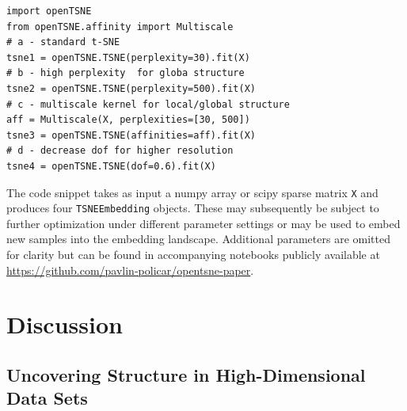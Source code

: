 \documentclass[twocolumn]{bmcart}
\begin{document}
\begin{verbatim}
import openTSNE
from openTSNE.affinity import Multiscale
# a - standard t-SNE
tsne1 = openTSNE.TSNE(perplexity=30).fit(X)
# b - high perplexity  for globa structure
tsne2 = openTSNE.TSNE(perplexity=500).fit(X)
# c - multiscale kernel for local/global structure
aff = Multiscale(X, perplexities=[30, 500])
tsne3 = openTSNE.TSNE(affinities=aff).fit(X)
# d - decrease dof for higher resolution
tsne4 = openTSNE.TSNE(dof=0.6).fit(X)
\end{verbatim}

\noindent The code snippet takes as input a \textsf{numpy} array or \textsf{scipy} sparse matrix \texttt{X} and produces four \texttt{TSNEEmbedding} objects. These may subsequently be subject to further optimization under different parameter settings or may be used to embed new samples into the embedding landscape. Additional parameters are omitted for clarity but can be found in accompanying notebooks publicly available at \url{https://github.com/pavlin-policar/opentsne-paper}.

\section*{Discussion}

\subsection*{Uncovering Structure in High-Dimensional Data Sets}
\end{document}
